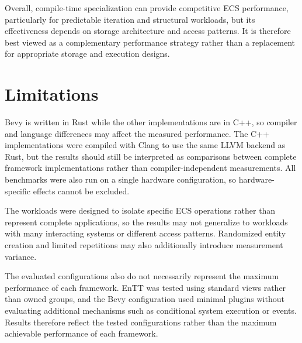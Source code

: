 \documentclass[conference]{IEEEtran}
\begin{document}
    Overall, compile-time specialization can provide competitive ECS performance, particularly for
    predictable iteration and structural workloads, but its effectiveness depends on storage
    architecture and access patterns.
    It is therefore best viewed as a complementary performance strategy rather than a replacement for
    appropriate storage and execution designs.


    \section{Limitations}
    \label{sec:limitations}

    Bevy is written in Rust while the other implementations are in C++, so compiler and language differences may affect the measured performance.
    The C++ implementations were compiled with Clang to use the same LLVM backend as Rust,
    but the results should still be interpreted as comparisons between complete framework implementations rather than compiler-independent measurements.
    All benchmarks were also run on a single hardware configuration, so hardware-specific effects cannot be excluded.

    The workloads were designed to isolate specific ECS operations rather than represent complete applications,
    so the results may not generalize to workloads with many interacting systems or different access patterns.
    Randomized entity creation and limited repetitions may also additionally introduce measurement variance.

    The evaluated configurations also do not necessarily represent the maximum performance of each framework.
    EnTT was tested using standard views rather than owned groups, and the Bevy configuration
    used minimal plugins without evaluating additional mechanisms such as conditional system execution or events.
    Results therefore reflect the tested configurations rather than the maximum achievable performance of each framework.

    
    
\end{document}
